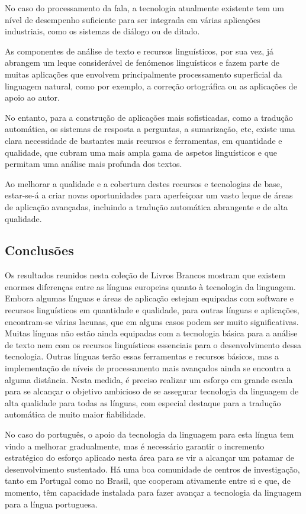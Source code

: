 \begin{multicols}{2}
No caso do processamento da fala, a tecnologia atualmente existente tem um nível de desempenho suficiente para ser integrada 
em várias aplicações industriais, como os sistemas de diálogo ou de ditado. 

As componentes de análise de texto e recursos linguísticos, por sua vez, já abrangem um leque considerável de fenómenos linguísticos 
e fazem parte de muitas aplicações que envolvem principalmente processamento superficial da linguagem natural, 
como por exemplo, a correção ortográfica ou as aplicações de apoio ao autor. 

No entanto, para a construção de aplicações mais sofisticadas, como a tradução automática,
os sistemas de resposta a perguntas, a sumarização, etc, 
existe uma clara necessidade de bastantes mais recursos e ferramentas, em quantidade e qualidade, 
que cubram uma mais ampla gama de aspetos linguísticos 
e que permitam uma análise mais profunda dos textos.

 Ao melhorar a qualidade e a cobertura destes recursos e tecnologias de base, estar-se-á 
a criar novas oportunidades para aperfeiçoar um vasto leque de áreas de aplicação avançadas, 
incluindo a tradução automática abrangente e de alta qualidade.

\subsection{Conclusões}


Os resultados reunidos nesta coleção de Livros Brancos mostram que existem enormes diferenças entre as línguas europeias quanto
à tecnologia da linguagem. 
Embora algumas línguas e áreas de aplicação estejam equipadas com software e recursos linguísticos em quantidade e qualidade, 
para outras línguas e aplicações, encontram-se várias lacunas, que em alguns casos podem ser muito significativas. 
Muitas línguas não estão ainda equipadas com a tecnologia básica para a análise de texto nem 
com os recursos linguísticos essenciais para o desenvolvimento dessa tecnologia. 
Outras línguas terão essas ferramentas e recursos básicos, mas a implementação de níveis
de processamento mais avançados ainda se encontra a alguma distância. 
Nesta medida, é preciso realizar um esforço em grande escala para se alcançar o objetivo ambicioso
de se assegurar tecnologia da linguagem de alta qualidade para todas as línguas,
com especial destaque para a tradução automática de muito maior fiabilidade.

No caso do português, o apoio da tecnologia da linguagem para esta língua tem vindo a melhorar
gradualmente, mas é necessário garantir o incremento estratégico do esforço aplicado nesta área
para se vir a alcançar um patamar de desenvolvimento sustentado. Há uma boa comunidade
de centros de investigação, tanto em Portugal como no Brasil, que cooperam ativamente entre
si e que, de momento, têm capacidade instalada para fazer avançar a tecnologia da linguagem 
para a língua portuguesa.


\end{multicols}
